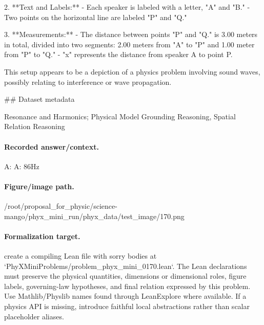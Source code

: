 2. **Text and Labels:**
   - Each speaker is labeled with a letter, "A" and "B."
   - Two points on the horizontal line are labeled "P" and "Q."

3. **Measurements:**
   - The distance between points "P" and "Q." is 3.00 meters in total, divided into two segments: 2.00 meters from "A" to "P" and 1.00 meter from "P" to "Q."
   - "x" represents the distance from speaker A to point P.

This setup appears to be a depiction of a physics problem involving sound waves, possibly relating to interference or wave propagation.

\#\# Dataset metadata

Resonance and Harmonics; Physical Model Grounding Reasoning, Spatial Relation Reasoning

\paragraph{Recorded answer/context.}
A: A: 86Hz

\paragraph{Figure/image path.}
/root/proposal\_for\_physic/science-mango/phyx\_mini\_run/phyx\_data/test\_image/170.png

\paragraph{Formalization target.}
create a compiling Lean file with sorry bodies at `PhyXMiniProblems/problem\_phyx\_mini\_0170.lean`. The Lean declarations must preserve the physical quantities, dimensions or dimensional roles, figure labels, governing-law hypotheses, and final relation expressed by this problem.
Use Mathlib/Physlib names found through LeanExplore where available. If a physics API is missing, introduce faithful local abstractions rather than scalar placeholder aliases.

